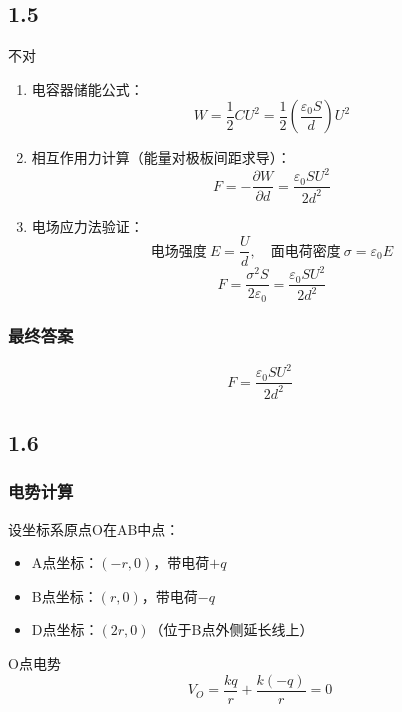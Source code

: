 \documentclass{article}
\begin{document}
\subsection*{1.5}
{\color{red}不对}
\begin{enumerate}
  \item 电容器储能公式：
  \[
  W = \frac{1}{2}CU^2 = \frac{1}{2} \left( \frac{\varepsilon_0 S}{d} \right) U^2
  \]
  
  \item 相互作用力计算（能量对极板间距求导）：
  \[
  F = -\frac{\partial W}{\partial d} = \frac{\varepsilon_0 S U^2}{2d^2}
  \]
  
  \item 电场应力法验证：
  \[
  \text{电场强度} \ E = \frac{U}{d},\quad \text{面电荷密度} \ \sigma = \varepsilon_0 E
  \]
  \[
  F = \frac{\sigma^2 S}{2\varepsilon_0} = \frac{\varepsilon_0 S U^2}{2d^2}
  \]
\end{enumerate}

\subsubsection*{最终答案}
\[
\boxed{F = \dfrac{\varepsilon_0 S U^2}{2d^2}}
\]

\subsection*{1.6}

\subsubsection*{电势计算}
设坐标系原点O在AB中点：
\begin{itemize}
  \item A点坐标：\( (-r, 0) \)，带电荷\( +q \)
  \item B点坐标：\( (r, 0) \)，带电荷\( -q \)
  \item D点坐标：\( (2r, 0) \)（位于B点外侧延长线上）
\end{itemize}

O点电势
\[
V_O = \frac{kq}{r} + \frac{k(-q)}{r} = 0
\]
\end{document}
